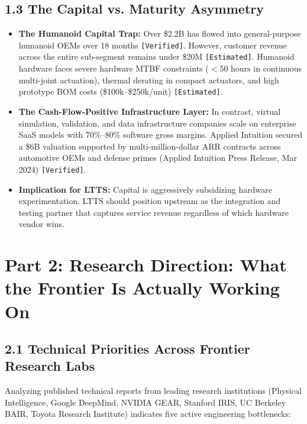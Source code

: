 \documentclass[11pt,a4paper]{article}
\begin{document}
\subsection{1.3 The Capital vs. Maturity Asymmetry}
\begin{itemize}
    \item \textbf{The Humanoid Capital Trap:} Over \$2.2B has flowed into general-purpose humanoid OEMs over 18 months \texttt{[Verified]}. However, customer revenue across the entire sub-segment remains under \$20M \texttt{[Estimated]}. Humanoid hardware faces severe hardware MTBF constraints ($<50\text{ hours}$ in continuous multi-joint actuation), thermal derating in compact actuators, and high prototype BOM costs (\$100k--\$250k/unit) \texttt{[Estimated]}.
    \item \textbf{The Cash-Flow-Positive Infrastructure Layer:} In contrast, virtual simulation, validation, and data infrastructure companies scale on enterprise SaaS models with 70\%--80\% software gross margins. Applied Intuition secured a \$6B valuation supported by multi-million-dollar ARR contracts across automotive OEMs and defense primes (Applied Intuition Press Release, Mar 2024) \texttt{[Verified]}.
    \item \textbf{Implication for LTTS:} Capital is aggressively subsidizing hardware experimentation. LTTS should position upstream as the integration and testing partner that captures service revenue regardless of which hardware vendor wins.
\end{itemize}

\section{Part 2: Research Direction: What the Frontier Is Actually Working On}

\subsection{2.1 Technical Priorities Across Frontier Research Labs}
Analyzing published technical reports from leading research institutions (Physical Intelligence, Google DeepMind, NVIDIA GEAR, Stanford IRIS, UC Berkeley BAIR, Toyota Research Institute) indicates five active engineering bottlenecks:
\end{document}
